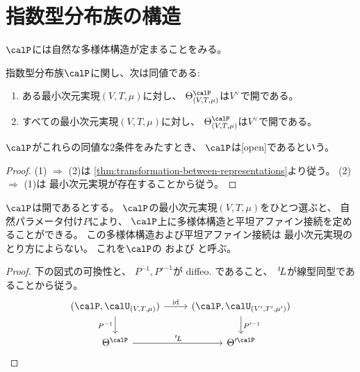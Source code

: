 \documentclass[report]{jlreq}
\begin{document}
%
\section{指数型分布族の構造}

$\calP$には自然な多様体構造が定まることをみる。

\begin{propdef}
    指数型分布族$\calP$に関し、次は同値である:
    \begin{enumerate}
        \item ある最小次元実現$(V, T, \mu)$に対し、
            $\Theta^\calP_{(V, T, \mu)}$は$V^\vee$で開である。
        \item すべての最小次元実現$(V, T, \mu)$に対し、
            $\Theta^\calP_{(V, T, \mu)}$は$V^\vee$で開である。
    \end{enumerate}
    $\calP$がこれらの同値な2条件をみたすとき、
    $\calP$は[open]であるという。
\end{propdef}

\begin{proof}
    (1) $\Rightarrow$ (2)は
    \cref{thm:transformation-between-representations}より従う。
    (2) $\Rightarrow$ (1)は
    最小次元実現が存在することから従う。
\end{proof}

\begin{propdef}
    $\calP$は開であるとする。
    $\calP$の最小次元実現$(V, T, \mu)$をひとつ選ぶと、
    自然パラメータ付け$P$により、
    $\calP$上に多様体構造と平坦アファイン接続を定めることができる。
    この多様体構造および平坦アファイン接続は
    最小次元実現のとり方によらない。
    これを$\calP$の
    および
    と呼ぶ。
\end{propdef}

\begin{proof}
    下の図式の可換性と、
    $P^{-1}, P'^{-1}$が diffeo. であること、
    $\,{}^{t}\!L$が線型同型であることから従う。
    \begin{equation}
        \begin{tikzcd}
            (\calP, \calU_{(V, T, \mu)})
                \ar{d}[swap]{P^{-1}}
                \ar{r}{\id}
                &(\calP, \calU_{(V', T', \mu')})
                    \ar{d}{P'^{-1}}
                \\
            \Theta^\calP
                \ar{r}{\up{t}L}
                &\Theta'^\calP
        \end{tikzcd}
    \end{equation}
\end{proof}
\end{document}
